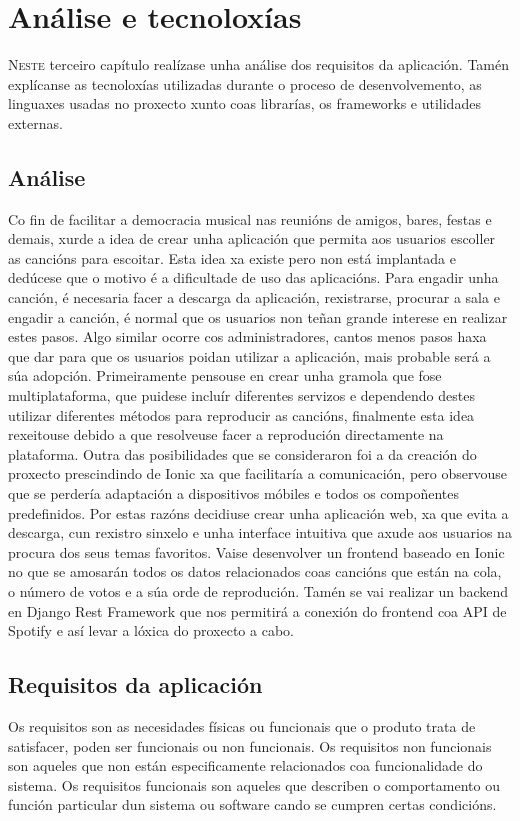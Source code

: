 \chapter{Análise e tecnoloxías}
\label{chap:analise_tecnoloxias}

\lettrine{N}{este} terceiro capítulo realízase unha análise dos requisitos da aplicación. Tamén explícanse as tecnoloxías utilizadas durante o proceso de desenvolvemento, as linguaxes usadas no proxecto xunto coas librarías, os frameworks e utilidades externas.

\section{Análise}
Co fin de facilitar a democracia musical nas reunións de amigos, bares, festas e demais, xurde a idea de crear unha aplicación que permita aos usuarios escoller as cancións para escoitar. Esta idea xa existe pero non está implantada e dedúcese que o motivo é a dificultade de uso das aplicacións. Para engadir unha canción, é necesaria facer a descarga da aplicación, rexistrarse, procurar a sala e engadir a canción, é normal que os usuarios non teñan grande interese en realizar estes pasos. Algo similar ocorre cos administradores, cantos menos pasos haxa que dar para que os usuarios poidan utilizar a aplicación, mais probable será a súa adopción.\smallbreak
Primeiramente pensouse en crear unha gramola que fose multiplataforma, que puidese incluír diferentes servizos e dependendo destes utilizar diferentes métodos para reproducir as cancións, finalmente esta idea rexeitouse debido a que resolveuse facer a reprodución directamente na plataforma.\smallbreak
Outra das posibilidades que se consideraron foi a da creación do proxecto prescindindo de Ionic xa que facilitaría a comunicación, pero observouse que se perdería adaptación a dispositivos móbiles e todos os compoñentes predefinidos.\smallbreak 
Por estas razóns decidiuse crear unha aplicación web, xa que evita a descarga, cun rexistro sinxelo e unha interface intuitiva que axude aos usuarios na procura dos seus temas favoritos. Vaise desenvolver un frontend baseado en Ionic no que se amosarán todos os datos relacionados coas cancións que están na cola, o número de votos e a súa orde de reprodución. Tamén se vai realizar un backend en Django Rest Framework que nos permitirá a conexión do frontend coa API de Spotify e así levar a lóxica do proxecto a cabo.\medbreak

\section{Requisitos da aplicación}
Os requisitos son as necesidades físicas ou funcionais que o produto trata de satisfacer, poden ser funcionais ou non funcionais. Os requisitos non funcionais son aqueles que non están especificamente relacionados coa funcionalidade do sistema. Os requisitos funcionais son aqueles que describen o comportamento ou función particular dun sistema ou software cando se cumpren certas condicións.

